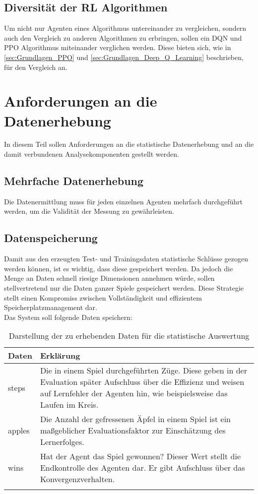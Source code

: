 \subsection{Diversität der RL Algorithmen} \label{subsec:Anforderungen_Diversität}
Um nicht nur Agenten eines Algorithmus untereinander zu vergleichen, sondern auch den Vergleich zu anderen Algorithmen zu erbringen, sollen ein DQN und PPO Algorithmus miteinander verglichen werden. 
Diese bieten sich, wie in \autoref{sec:Grundlagen_PPO} und \autoref{sec:Grundlagen_Deep_Q_Learning} beschrieben, für den Vergleich an.

\section{Anforderungen an die Datenerhebung} \label{sec:Anforderungen_an_die_Datenerhebung}
In diesem Teil sollen Anforderungen an die statistische Datenerhebung und an die damit verbundenen Analysekomponenten gestellt werden.

\subsection{Mehrfache Datenerhebung} \label{subsec:Anforderungen_mehrfache_Datenerhebung}
Die Datenermittlung muss für jeden einzelnen Agenten mehrfach durchgeführt werden, um die Validität der Messung zu gewährleisten. \citep[S. 135]{DL}

\subsection{Datenspeicherung} \label{subsec:Anforderungen_Datenspeicherung}
Damit aus den erzeugten Test- und Trainingsdaten statistische Schlüsse gezogen werden können, ist es wichtig, dass diese gespeichert werden. Da jedoch die Menge an Daten schnell riesige Dimensionen annehmen würde, sollen stellvertretend nur die Daten ganzer Spiele gespeichert werden. Diese Strategie stellt einen Kompromiss zwischen Vollständigkeit und effizientem Speicherplatzmanagement dar.\\
Das System soll folgende Daten speichern:
\begin{longtable}[h]{|p{4cm}|p{\linewidth - 5cm}|}
	\hline
	Daten & Erklärung \\
	\hline
	steps & Die in einem Spiel durchgeführten Züge. Diese geben in der Evaluation später Aufschluss über die Effizienz und weisen auf Lernfehler der Agenten hin, wie beispielsweise das Laufen im Kreis.\\
	\hline
	apples & Die Anzahl der gefressenen Äpfel in einem Spiel ist ein maßgeblicher Evaluationsfaktor zur Einschätzung des Lernerfolges.\\
	\hline
	wins & Hat der Agent das Spiel gewonnen? Dieser Wert stellt die Endkontrolle des Agenten dar. Er gibt Aufschluss über das Konvergenzverhalten.\\
	\hline
	\caption[Darstellung der zu erhebende Daten]{Darstellung der zu erhebenden Daten für die statistische Auswertung}
	\label{tab:Anforderungen_Datenerhebung} 
\end{longtable}

